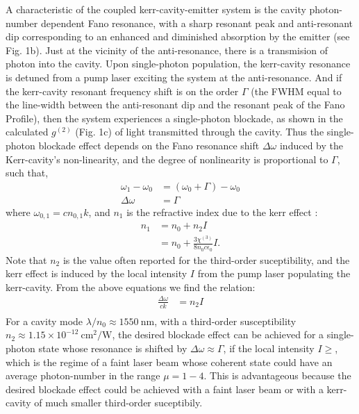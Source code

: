\documentclass[12pt]{article}
\begin{document}
A characteristic of the coupled kerr-cavity-emitter system is the cavity 
photon-number dependent Fano resonance, with a sharp resonant peak and 
anti-resonant dip corresponding to an enhanced and diminished absorption by the
emitter (see Fig. 1b). Just at the vicinity of the  anti-resonance, there is a 
transmision of photon into the cavity. Upon single-photon population, the
kerr-cavity resonance is detuned from a pump laser exciting the system at the
anti-resonance. And if the kerr-cavity resonant frequency shift is on the order 
$\Gamma$ (the FWHM equal to the line-width between the anti-resonant dip and 
the resonant peak of the Fano Profile), then the system experiences a 
single-photon blockade, as shown in the calculated $g^{(2)}$ (Fig. 1c) of light 
transmitted through the cavity. Thus the single-photon blockade effect depends 
on the Fano resonance shift $\Delta\omega$ induced by the Kerr-cavity's 
non-linearity, and the degree of nonlinearity is proportional to $\Gamma$, 
such that,
\begin{equation}
\begin{split}
\omega_1 - \omega_0 &= (\omega_0 + \Gamma ) - \omega_0
\\
\Delta\omega &= \Gamma
\end{split}
\end{equation}
where $\omega_{0,1} = c n_{0,1} k$, and $n_1$ is the refractive index due
to the kerr effect \cite{spillane2002ultralow}:
\begin{equation}
\begin{split}
n_1 &= n_0 + n_2 I
\\
&= n_0 + \frac{3 \chi^{(3)}}{8 n_0 c\epsilon_0} I.
\end{split}
\end{equation}
Note that $n_2$ is the value often reported for the third-order suceptibility,
and the kerr effect is induced by the local intensity $I$ from the pump laser 
populating the kerr-cavity. From the above equations we find the relation:
\begin{equation}
\begin{split}
\frac{\Delta \omega}{ck} &= n_2 I \\
\end{split}
\end{equation}
For a cavity mode $\lambda/{n_0} \approx 1550 \:\mathrm{nm}$, with a 
third-order susceptibility $n_2 \approx 1.15 \times 10^{-12}
\:\mathrm{cm}^2/\mathrm{W}$, \cite{qin2010design} the desired blockade effect 
can be achieved for a single-photon state whose resonance is shifted by
$\Delta\omega \approx \Gamma$, if the local intensity $I \ge $, which is
the regime of a faint laser beam whose coherent state could have an average 
photon-number in the range $\mu = 1-4$. This is advantageous because the 
desired blockade effect could be achieved with a faint laser beam or with a 
kerr-cavity of much smaller third-order suceptibily.
\end{document}
